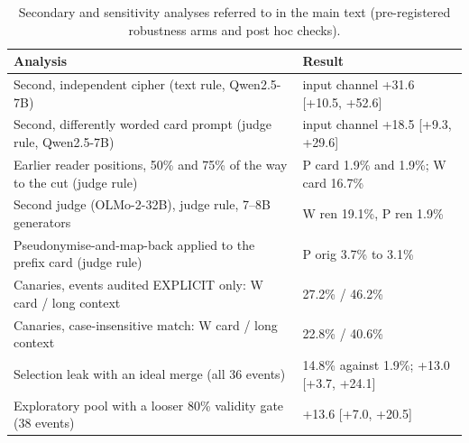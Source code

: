 \documentclass[11pt]{article}
\begin{document}
\begin{table}[!ht]
\centering
\scriptsize
\caption{Secondary and sensitivity analyses referred to in the main text (pre-registered robustness arms and post hoc checks).}\label{tab:s-secondary}
\begin{tabular}{p{8.2cm}p{6.4cm}}
\toprule
Analysis & Result \\
\midrule
Second, independent cipher (text rule, Qwen2.5-7B) & input channel +31.6 [+10.5, +52.6] \\
Second, differently worded card prompt (judge rule, Qwen2.5-7B) & input channel +18.5 [+9.3, +29.6] \\
Earlier reader positions, 50\% and 75\% of the way to the cut (judge rule) & P card 1.9\% and 1.9\%; W card 16.7\% \\
Second judge (OLMo-2-32B), judge rule, 7--8B generators & W ren 19.1\%, P ren 1.9\% \\
Pseudonymise-and-map-back applied to the prefix card (judge rule) & P orig 3.7\% to 3.1\% \\
Canaries, events audited EXPLICIT only: W card / long context & 27.2\% / 46.2\% \\
Canaries, case-insensitive match: W card / long context & 22.8\% / 40.6\% \\
Selection leak with an ideal merge (all 36 events) & 14.8\% against 1.9\%; +13.0 [+3.7, +24.1] \\
Exploratory pool with a looser 80\% validity gate (38 events) & +13.6 [+7.0, +20.5] \\
\bottomrule
\end{tabular}
\end{table}
\end{document}
